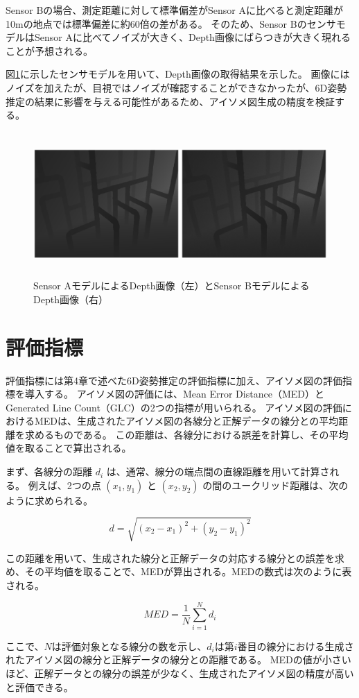 Sensor Bの場合、測定距離に対して標準偏差がSensor Aに比べると測定距離が10mの地点では標準偏差に約60倍の差がある。
そのため、Sensor BのセンサモデルはSensor Aに比べてノイズが大きく、Depth画像にばらつきが大きく現れることが予想される。

図\ref{fig:f3}に示したセンサモデルを用いて、Depth画像の取得結果を示した。
画像にはノイズを加えたが、目視ではノイズが確認することができなかったが、6D姿勢推定の結果に影響を与える可能性があるため、アイソメ図生成の精度を検証する。
\begin{figure}[htbt]
    \centering
    \includegraphics[height=55mm]{Figure/depth_sim.eps}
    \caption{Sensor AモデルによるDepth画像（左）とSensor BモデルによるDepth画像（右）}
    \label{fig:f3}
\end{figure}

\section{評価指標}
評価指標には第4章で述べた6D姿勢推定の評価指標に加え、アイソメ図の評価指標を導入する。
アイソメ図の評価には、Mean Error Distance（MED）とGenerated Line Count（GLC）の2つの指標が用いられる。
アイソメ図の評価におけるMEDは、生成されたアイソメ図の各線分と正解データの線分との平均距離を求めるものである。
この距離は、各線分における誤差を計算し、その平均値を取ることで算出される。

まず、各線分の距離 $d_i$ は、通常、線分の端点間の直線距離を用いて計算される。
例えば、2つの点 $(x_1, y_1)$ と $(x_2, y_2)$ の間のユークリッド距離は、次のように求められる。

\[
d = \sqrt{(x_2 - x_1)^2 + (y_2 - y_1)^2}
\]

この距離を用いて、生成された線分と正解データの対応する線分との誤差を求め、その平均値を取ることで、MEDが算出される。MEDの数式は次のように表される。

\[
MED = \frac{1}{N} \sum_{i=1}^{N} d_i
\]

ここで、$N$は評価対象となる線分の数を示し、$d_i$は第$i$番目の線分における生成されたアイソメ図の線分と正解データの線分との距離である。
MEDの値が小さいほど、正解データとの線分の誤差が少なく、生成されたアイソメ図の精度が高いと評価できる。

